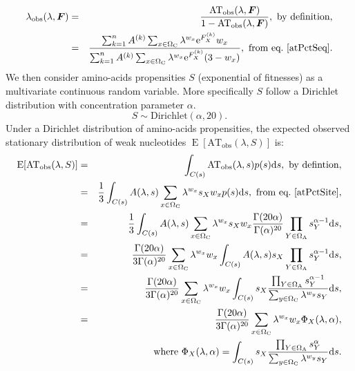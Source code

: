 \documentclass{article}
\newcommand{\e}{\mathrm{e}}
\newcommand{\der}{\mathrm{d}}
\newcommand{\SetCodon}{\Omega_{\mathrm{C}}}
\newcommand{\SetAa}{\Omega_{\mathrm{A}}}
\begin{document}
    \begin{eqnarray}
	    \lambda_{\mathrm{obs}} (\lambda, \bm{F})
	    & = &  \frac{\mathrm{AT_{obs}}(\lambda, \bm{F})}{ 1 - \mathrm{AT_{obs}}(\lambda, \bm{F}) }, \ \textrm{by definition},\\
	    & = & \dfrac{ \sum_{k=1}^{n}  A^{(k)} \sum_{x \in \SetCodon} \lambda^{w_x} \e^{F_X^{(k)}} w_x}{ \sum_{k=1}^{n} A^{(k)} \sum_{x \in \SetCodon} \lambda^{w_x} \e^{F_X^{(k)}} (3 - w_x )}, \ \textrm{from eq.} \ \ref{atPctSeq}.
    \end{eqnarray}
    We then consider amino-acids propensities $S$ (exponential of fitnesses) as a multivariate continuous random variable. More specifically $S$ follow a Dirichlet distribution with concentration parameter $\alpha$.
    \begin{equation}
    	S \sim \mathrm{Dirichlet}(\alpha, 20).
    \end{equation}
    Under a Dirichlet distribution of amino-acids propensities, the expected observed stationary distribution of weak nucleotides $\operatorname{E} [\mathrm{AT_{obs}}(\lambda, S)]$ is:
    \begin{eqnarray}
	    \operatorname{E} [\mathrm{AT_{obs}}(\lambda, S)]
	    & = & \int_{C(s)} \mathrm{AT_{obs}}(\lambda, s) p(s) \der s, \ \textrm{by defintion}, \\
		& = & \frac{1}{3} \int_{C(s)} A(\lambda, s) \sum_{x \in \SetCodon} 
		 \lambda^{w_x} s_X w_x p(s) \der s, \ \textrm{from eq.} \ \ref{atPctSite}, \\
		& = & \frac{1}{3} \int_{ C(s)} A(\lambda, s) \sum_{x \in \SetCodon}  \lambda^{w_x} s_X w_x {\frac {\Gamma (20 \alpha)}{\Gamma (\alpha )^{20}}} \prod_{Y \in \SetAa} s_Y^{\alpha-1} \der s, \\
		& = & {\frac {\Gamma (20 \alpha)}{3\Gamma (\alpha )^{20}}} \sum_{x \in \SetCodon} \lambda^{w_x} w_x  \int_{ C(s)} A(\lambda, s) s_X \prod_{Y \in \SetAa} s_Y^{\alpha-1} \der s, \\
		& = & {\frac {\Gamma (20 \alpha)}{3\Gamma (\alpha )^{20}}} \sum_{x \in \SetCodon} \lambda^{w_x} w_x \int_{ C(s)} s_X \dfrac{\prod_{Y \in \SetAa} s_Y^{\alpha-1}}{\sum_{y \in \SetCodon} \lambda^{w_y} s_Y} \der s, \\
		& = & {\frac {\Gamma (20 \alpha)}{3\Gamma (\alpha )^{20}}} \sum_{x \in \SetCodon} \lambda^{w_x} w_x \Phi_X(\lambda, \alpha),\\
		& & \textrm{where} \  \Phi_X(\lambda, \alpha) = \int_{ C(s)} s_X \dfrac{\prod_{Y \in \SetAa} s_Y^{\alpha}}{\sum_{y \in \SetCodon} \lambda^{w_y} s_Y}\der s.
		\label{atPctSeqExpected}
    \end{eqnarray}
\end{document}
